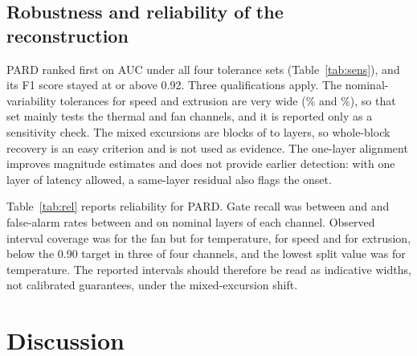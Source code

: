 \documentclass[10pt,a4paper,twocolumn]{article}
\begin{document}
\subsection{Robustness and reliability of the reconstruction}\label{sec:robust}
PARD ranked first on AUC under all four tolerance sets (Table~\ref{tab:sens}), and its F1 score stayed at or above 0.92. Three qualifications apply. The nominal-variability tolerances for speed and extrusion are very wide (\tolBSp\% and \tolBFl\%), so that set mainly tests the thermal and fan channels, and it is reported only as a sensitivity check. The mixed excursions are blocks of \evLenMin{} to \evLenMax{} layers, so whole-block recovery is an easy criterion and is not used as evidence. The one-layer alignment improves magnitude estimates and does not provide earlier detection: with one layer of latency allowed, a same-layer residual also flags the onset.

\begin{table}[t]\centering\small
\caption{Execution-fidelity AUC and F1 under alternative tolerance sets (mean over five splits; bold marks the best method).}\label{tab:sens}
\end{table}

\label{sec:rel}Table~\ref{tab:rel} reports reliability for PARD. Gate recall was between \rclSpPard{} and \rclThPard{} and false-alarm rates between \farSpPard{} and \farThPard{} on nominal layers of each channel. Observed interval coverage was \covCoPard{} for the fan but \covThPard{} for temperature, \covSpPard{} for speed and \covFlPard{} for extrusion, below the 0.90 target in three of four channels, and the lowest split value was \covMinThPard{} for temperature. The reported intervals should therefore be read as indicative widths, not calibrated guarantees, under the mixed-excursion shift.

\begin{table}[t]\centering\small
\caption{Reliability of the PARD reconstruction on mixed evaluation prints (mean over five splits). Coverage target 0.90.}\label{tab:rel}
\end{table}

\section{Discussion}
\end{document}
